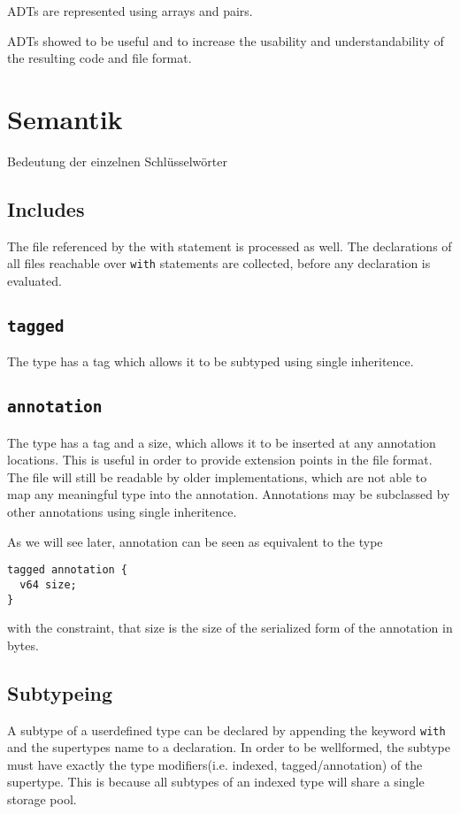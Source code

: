 \documentclass[a4paper,10pt]{article}
\begin{document}
ADTs are represented using arrays and pairs.

ADTs showed to be useful and to increase the usability and understandability of the resulting code and file format.

\section{Semantik}

Bedeutung der einzelnen Schlüsselwörter

\subsection{Includes}
The file referenced by the with statement is processed as well. The declarations of all files reachable over \texttt{with} statements are collected, before any declaration is evaluated.

\subsection{\texttt{tagged}}
The type has a tag which allows it to be subtyped using single inheritence.

\subsection{\texttt{annotation}}
The type has a tag and a size, which allows it to be inserted at any annotation locations. This is useful in order to provide extension points in the file format. The file will still be readable by older implementations, which are not able to map any meaningful type into the annotation. Annotations may be subclassed by other annotations using single inheritence.

As we will see later, annotation can be seen as equivalent to the type
\begin{verbatim}
tagged annotation {
  v64 size;
}
\end{verbatim}
with the constraint, that size is the size of the serialized form of the annotation in bytes.

\subsection{Subtypeing}
A subtype of a userdefined type can be declared by appending the keyword \texttt{with} and the supertypes name to a declaration. In order to be wellformed, the subtype must have exactly the type modifiers(i.e. indexed, tagged/annotation) of the supertype. This is because all subtypes of an indexed type will share a single storage pool.
\end{document}
